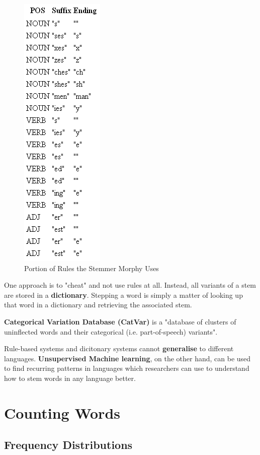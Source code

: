 \documentclass{article}
\begin{document}
\begin{figure}
	\centering
	\includegraphics[scale=0.4]{figures/morphy-rules.png}
	\caption{Portion of Rules the Stemmer Morphy Uses}
	\label{fig:morphy-rules}
\end{figure}

One approach is to "cheat" and not use rules at all. Instead, all variants of a stem are stored in a \textbf{dictionary}. Stepping a word is simply a matter of looking up that word in a dictionary and retrieving the associated stem.

\textbf{Categorical Variation Database (CatVar)} is a "database of clusters of uninflected words and their categorical (i.e. part-of-speech) variants".

Rule-based systems and dicitonary systems cannot \textbf{generalise} to different languages. \textbf{Unsupervised Machine learning}, on the other hand, can be used to find recurring patterns in languages which researchers can use to understand how to stem words in any language better.

\section{Counting Words}

\subsection{Frequency Distributions}
\end{document}
